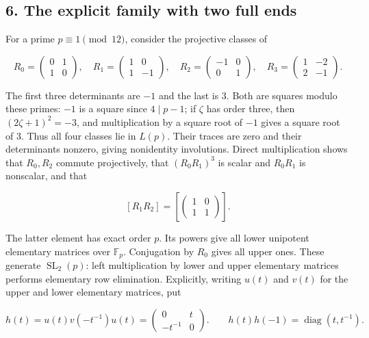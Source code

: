 \documentclass[
  11pt,
]{article}
\begin{document}
\subsection{6. The explicit family with two full
ends}\label{the-explicit-family-with-two-full-ends}

For a prime \(p\equiv1\pmod{12}\), consider the projective classes of

\[R_0=\begin{pmatrix}0&1\\1&0\end{pmatrix},\quad
R_1=\begin{pmatrix}1&0\\1&-1\end{pmatrix},\quad
R_2=\begin{pmatrix}-1&0\\0&1\end{pmatrix},\quad
R_3=\begin{pmatrix}1&-2\\2&-1\end{pmatrix}.\tag{4}\]

The first three determinants are \(-1\) and the last is \(3\). Both are
squares modulo these primes: \(-1\) is a square since \(4\mid p-1\); if
\(\zeta\) has order three, then \((2\zeta+1)^2=-3\), and multiplication
by a square root of \(-1\) gives a square root of \(3\). Thus all four
classes lie in \(L(p)\). Their traces are zero and their determinants
nonzero, giving nonidentity involutions. Direct multiplication shows
that \(R_0,R_2\) commute projectively, that \((R_0R_1)^3\) is scalar and
\(R_0R_1\) is nonscalar, and that

\[[R_1R_2]=\left[\begin{pmatrix}1&0\\1&1\end{pmatrix}\right].\tag{5}\]

The latter element has exact order \(p\). Its powers give all lower
unipotent elementary matrices over \(\mathbb F_p\). Conjugation by
\(R_0\) gives all upper ones. These generate \(\operatorname{SL}_2(p)\):
left multiplication by lower and upper elementary matrices performs
elementary row elimination. Explicitly, writing \(u(t)\) and \(v(t)\)
for the upper and lower elementary matrices, put

\[h(t)=u(t)v(-t^{-1})u(t)=\begin{pmatrix}0&t\\-t^{-1}&0\end{pmatrix}.
\qquad h(t)h(-1)=\operatorname{diag}(t,t^{-1}).\]
\end{document}
